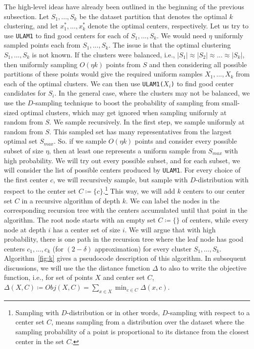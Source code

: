 \documentclass[11pt]{llncs}
\begin{document}
The high-level ideas have already been outlined in the beginning of the previous subsection. Let $S_1, ..., S_k$ be the dataset partition that denotes the optimal $k$ clustering, and let $x^*_1, ..., x^*_k$ denote the optimal centers, respectively. Let us try to use {\tt ULAM1} to find good centers for each of $S_1, ..., S_k$. We would need $\eta$ uniformly sampled points each from $S_1, ..., S_k$. 
The issue is that the optimal clustering $S_1, ..., S_k$ is not known.
If the clusters were balanced, i.e., $|S_1| \approx |S_2| \approx ... \approx |S_k|$, then uniformly sampling $O(\eta k)$ points from $S$ and then considering all possible partitions of these points would give the required uniform samples $X_1, ..., X_k$ from each of the optimal clusters. We can then use {\tt ULAM1($X_i$)} to find good center candidates for $S_i$. 
In the general case, where the clusters may not be balanced, we use the $D$-sampling technique to boost the probability of sampling from small-sized optimal clusters, which may get ignored when sampling uniformly at random from $S$. We sample recursively. In the first step, we sample uniformly at random from $S$. This sampled set has many representatives from the largest optimal set $S_{max}$. So. if we sample $O(\eta k)$ points and consider every possible subset of size $\eta$, then at least one represents a uniform sample from $S_{max}$ with high probability. We will try out every possible subset, and for each subset, we will consider the list of possible centers produced by {\tt ULAM1}. 
For every choice of the first center $c$, we will recursively sample, but sample with $D$-distribution with respect to the center set $C \coloneqq \{c\}$.\footnote{Sampling with $D$-distribution or in other words, $D$-sampling with respect to a center set $C$, means sampling from a distribution over the dataset where the sampling probability of a point is proportional to its distance from the closest center in the set $C$.}
This way, we will add $k$ centers to our center set $C$ in a recursive algorithm of depth $k$. 
We can label the nodes in the corresponding recursion tree with the centers accumulated until that point in the algorithm. The root node starts with an empty set $C \coloneqq \{\}$ of centers, while every node at depth $i$ has a center set of size $i$.
We will argue that with high probability, there is one path in the recursion tree where the leaf node has good centers $c_1, ..., c_k$ (for $(2-\delta)$ approximation) for every cluster $S_1, ..., S_k$. 
Algorithm~\ref{fig:k} gives a pseudocode description of this algorithm. In subsequent discussions, we will use the the distance function $\Delta$ to also to write the objective function, i.e., for set of points $X$ and center set $C$, $\Delta(X, C) \coloneqq Obj(X, C) = \sum_{x \in X} \min_{c \in C} \Delta(x, c)$.
\end{document}
